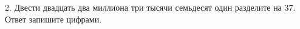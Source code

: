 2. Двести двадцать два миллиона три тысячи семьдесят один разделите на 37. Ответ запишите цифрами.\\
